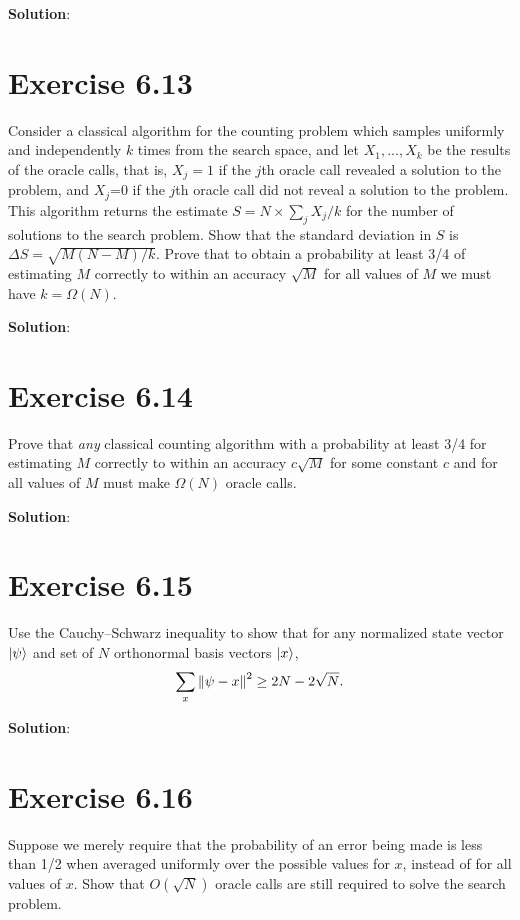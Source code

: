 \documentclass{book}
\begin{document}
        \textbf{Solution}:
    
    \section*{Exercise 6.13}
        Consider a classical algorithm for the counting problem which samples uniformly and independently $k$ times from the search space, and let $X_1, ..., X_k$ be the results of the oracle calls, that is, $X_j = 1$ if the $j$th oracle call revealed a solution to the problem, and $X_j$=0 if the $j$th oracle call did not reveal a solution to the problem. This algorithm returns the estimate $S = N\times \sum_j X_j/k$ for the number of solutions to the search problem. Show that the standard deviation in $S$ is $\Delta S = \sqrt{M(N-M)/k}$. Prove that to obtain a probability at least 3/4 of estimating $M$ correctly to within an accuracy $\sqrt{M}$ for all values of $M$ we must have $k = \Omega(N)$.
        
        \textbf{Solution}:
    
    \section*{Exercise 6.14}
        Prove that \emph{any} classical counting algorithm with a probability at least 3/4 for estimating $M$ correctly to within an accuracy $c\sqrt{M}$ for some constant $c$ and for all values of $M$ must make $\Omega (N)$ oracle calls. 
        
        \textbf{Solution}:
    
    \section*{Exercise 6.15}
        Use the Cauchy–Schwarz inequality to show that for any normalized state vector $\ket{\psi}$ and set of $N$ orthonormal basis vectors $\ket{x}$,
        \begin{align}
            \sum_x \norm{\psi -x}^2 \geq 2N-2\sqrt{N}.
        \end{align}
        
        \textbf{Solution}:
        
    \section*{Exercise 6.16}
        Suppose we merely require that the probability of an error being made is less than 1/2 when averaged uniformly over the possible values for $x$, instead of for all values of $x$. Show that $O(\sqrt{N})$ oracle calls are still required to solve the search problem. 
        
\end{document}
